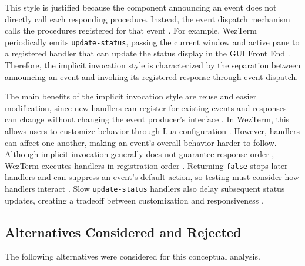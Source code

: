 This style is justified because the component announcing an event does not directly call each responding procedure. Instead, the event dispatch mechanism calls the procedures registered for that event \cite{arch-styles}. For example, WezTerm periodically emits \texttt{update-status}, passing the current window and active pane to a registered handler that can update the status display in the GUI Front End \cite{update-status}. Therefore, the implicit invocation style is characterized by the separation between announcing an event and invoking its registered response through event dispatch.

The main benefits of the implicit invocation style are reuse and easier modification, since new handlers can register for existing events and responses can change without changing the event producer's interface \cite{arch-styles}. In WezTerm, this allows users to customize behavior through Lua configuration \cite{event-registration}. However, handlers can affect one another, making an event's overall behavior harder to follow. Although implicit invocation generally does not guarantee response order \cite{arch-styles}, WezTerm executes handlers in registration order \cite{event-registration}. Returning \texttt{false} stops later handlers and can suppress an event's default action, so testing must consider how handlers interact \cite{event-registration}. Slow \texttt{update-status} handlers also delay subsequent status updates, creating a tradeoff between customization and responsiveness \cite{update-status}.

\subsection{Alternatives Considered and Rejected}

The following alternatives were considered for this conceptual analysis.

